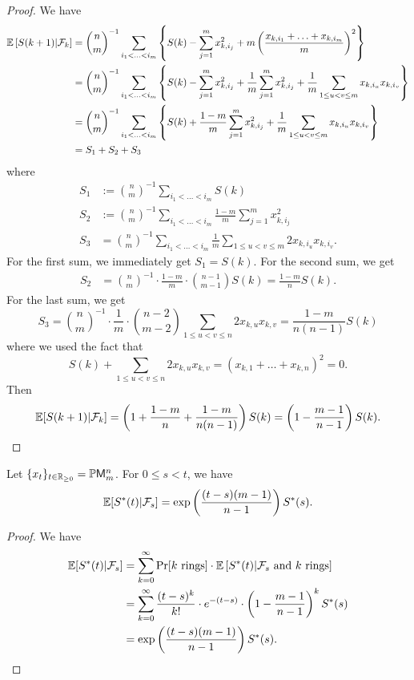 \documentclass[12pt]{article}
\begin{document}
\begin{proof}
	We have 
	\begin{align*}
		\mathbb{E} \left [ S(k+1) | \mathcal{F}_k \right ] & = \binom{n}{m}^{-1} \sum_{i_1 < \ldots < i_m} \left \{ S(k) - \sum_{j = 1}^m x_{k, i_j}^2 + m \left ( \frac{x_{k, i_1} + \ldots + x_{k, i_m}}{m} \right )^2 \right \} \\
		& = \binom{n}{m}^{-1} \sum_{i_1 < \ldots < i_m} \left \{ S(k) - \sum_{j = 1}^m x_{k, i_j}^2  + \frac{1}{m} \sum_{j = 1}^m x_{k, i_j}^2 + \frac{1}{m} \sum_{1 \leq u < v \leq m} x_{k, i_u} x_{k, i_v} \right \} \\
		& = \binom{n}{m}^{-1} \sum_{i_1 < \ldots < i_m} \left \{ S(k) + \frac{1-m}{m} \sum_{j = 1}^m x_{k, i_j}^2 + \frac{1}{m} \sum_{1 \leq u < v \leq m} x_{k, i_u} x_{k, i_v} \right \} \\
		& = S_1 + S_2 + S_3
	\end{align*}
	where 
	\begin{align*}
		S_1 & := \binom{n}{m}^{-1} \sum_{i_1 < \ldots < i_m} S(k) \\
		S_2 & := \binom{n}{m}^{-1} \sum_{i_1 < \ldots < i_m} \frac{1-m}{m} \sum_{j = 1}^m x_{k, i_j}^2 \\
		S_3 & = \binom{n}{m}^{-1} \sum_{i_1 < \ldots < i_m} \frac{1}{m} \sum_{1 \leq u < v \leq m} 2x_{k, i_u} x_{k, i_v}.
	\end{align*}
	For the first sum, we immediately get $S_1 = S(k)$. For the second sum, we get 
	\begin{align*}
		S_2 & = \binom{n}{m}^{-1} \cdot \frac{1-m}{m} \cdot \binom{n-1}{m-1} S(k) = \frac{1-m}{n} S(k). 
	\end{align*}
	For the last sum, we get 
	\[
		S_3 = \binom{n}{m}^{-1} \cdot \frac{1}{m} \cdot \binom{n-2}{m-2} \sum_{1 \leq u < v \leq n} 2x_{k, u} x_{k, v} = \frac{1-m}{n(n-1)} S(k)
	\]
	where we used the fact that 
	\[
		S(k) + \sum_{1 \leq u < v \leq n} 2x_{k, u} x_{k, v} = (x_{k, 1} + \ldots + x_{k, n})^2 = 0.	
	\]
	Then 
	\[
		\mathbb{E} [S(k+1) | \mathcal{F}_k] = \left ( 1 + \frac{1-m}{n} + \frac{1-m}{n(n-1)} \right ) S(k) = \left ( 1 - \frac{m-1}{n-1} \right ) S(k).	
	\]
\end{proof}

\begin{cor}
	Let $\{x_t\}_{t \in \mathbb{R}_{\geq 0}} = \mathbb{P} \mathsf{M}_m^n$. For $0 \leq s < t$, we have 
	\[
		\mathbb{E} [S^*(t) | \mathcal{F}_s] = \exp \left ( \frac{(t-s)(m-1)}{n-1} \right ) S^*(s).	
	\]
\end{cor}
\begin{proof}
	We have 
	\begin{align*}
		\mathbb{E} [ S^*(t) | \mathcal{F}_s ] & = \sum_{k = 0}^\infty \Pr[k \text{ rings}] \cdot \mathbb{E} \left [ S^*(t) | \mathcal{F}_s \text{ and } k \text{ rings} \right ] \\
		& = \sum_{k = 0}^\infty \frac{(t-s)^k}{k!} \cdot e^{-(t-s)} \cdot \left ( 1 - \frac{m-1}{n-1} \right )^k S^*(s) \\
		& = \exp \left ( \frac{(t-s)(m-1)}{n-1} \right ) S^*(s). 
	\end{align*}
\end{proof}
\newpage 


\end{document}
